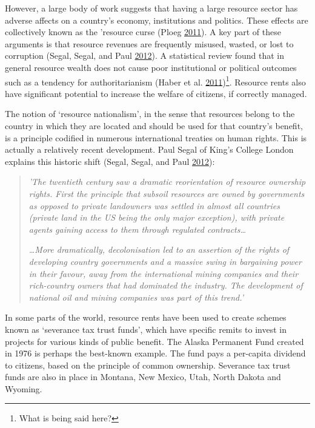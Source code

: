 \documentclass[]{tufte-handout}
\begin{document}
However, a large body of work suggests that having a large resource
sector has adverse affects on a country's economy, institutions and
politics. These effects are collectively known as the 'resource curse
(Ploeg \protect\hyperlink{ref-Ploeg2011}{2011}). A key part of these
arguments is that resource revenues are frequently misused, wasted, or
lost to corruption (Segal, Segal, and Paul
\protect\hyperlink{ref-Segal2012}{2012}). A statistical review found
that in general resource wealth does not cause poor institutional or
political outcomes such as a tendency for authoritarianism (Haber et al.
\protect\hyperlink{ref-Haber2011}{2011})\footnote{What is being said
  here?}. Resource rents also have significant potential to increase the
welfare of citizens, if correctly managed.

The notion of `resource nationalism', in the sense that resources belong
to the country in which they are located and should be used for that
country's benefit, is a principle codified in numerous international
treaties on human rights. This is actually a relatively recent
development. Paul Segal of King's College London explains this historic
shift (Segal, Segal, and Paul \protect\hyperlink{ref-Segal2012}{2012}):

\begin{quote}
\emph{'The twentieth century saw a dramatic reorientation of resource
ownership rights. First the principle that subsoil resources are owned
by governments as opposed to private landowners was settled in almost
all countries (private land in the US being the only major exception),
with private agents gaining access to them through regulated
contracts\ldots{}}

\emph{\ldots{}More dramatically, decolonisation led to an assertion of
the rights of developing country governments and a massive swing in
bargaining power in their favour, away from the international mining
companies and their rich-country owners that had dominated the industry.
The development of national oil and mining companies was part of this
trend.'}
\end{quote}

In some parts of the world, resource rents have been used to create
schemes known as `severance tax trust funds', which have specific remits
to invest in projects for various kinds of public benefit. The Alaska
Permanent Fund created in 1976 is perhaps the best-known example. The
fund pays a per-capita dividend to citizens, based on the principle of
common ownership. Severance tax trust funds are also in place in
Montana, New Mexico, Utah, North Dakota and Wyoming.
\end{document}
